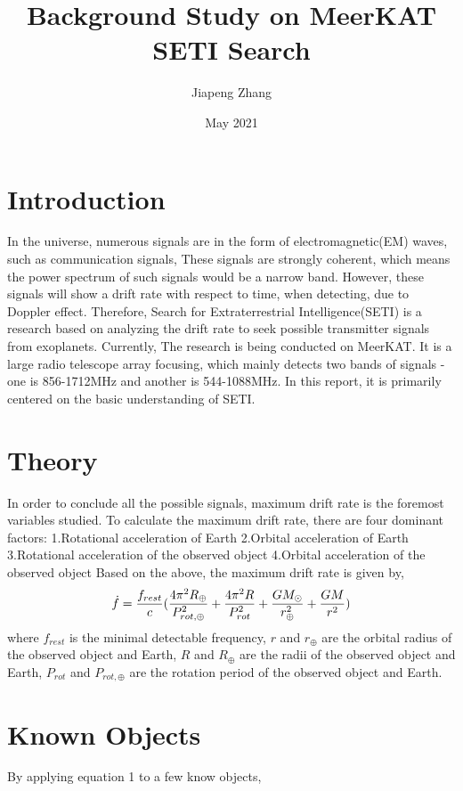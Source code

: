 \documentclass{article}
\title{Background Study on MeerKAT SETI Search}
\author{Jiapeng Zhang}
\date{May 2021}
\begin{document}
\maketitle

\section{Introduction}
In the universe, numerous signals are in the form of electromagnetic(EM) waves, such as communication signals, These signals are strongly coherent, which means the power spectrum of such signals would be a narrow band. However, these signals will show a drift rate with respect to time, when detecting, due to Doppler effect. Therefore, Search for Extraterrestrial Intelligence(SETI) is a research based on analyzing the drift rate to seek possible transmitter signals from exoplanets. Currently, The research is being conducted on MeerKAT. It is a large radio telescope array focusing, which mainly detects two bands of signals - one is 856-1712MHz and another is 544-1088MHz. In this report, it is primarily centered on the basic understanding of SETI.

\section{Theory}
In order to conclude all the possible signals, maximum drift rate is the foremost variables studied. To calculate the maximum drift rate, there are four dominant factors:
    1.Rotational acceleration of Earth
    2.Orbital acceleration of Earth
    3.Rotational acceleration of the observed object
    4.Orbital acceleration of the observed object
Based on the above, the maximum drift rate is given by,
\begin{equation}
    \centering
    \dot{f}=\frac{f_{rest}}{c}(\frac{4\pi^2R_{\oplus}}{P_{rot,\oplus}^2}+\frac{4\pi^2R}{P_{rot}^2}+\frac{GM_\odot}{r_\oplus^2}+\frac{GM}{r^2})
\end{equation}
where $f_{rest}$ is the minimal detectable frequency, $r$ and $r_\oplus$ are the orbital radius of the observed object and Earth, $R$ and $R_\oplus$ are the radii of the observed object and Earth, $P_{rot}$ and $P_{rot,\oplus}$ are the rotation period of the observed object and Earth.\cite{2019ApJ...884...14S}

\section{Known Objects}
By applying equation 1 to a few know objects,
\end{document}
